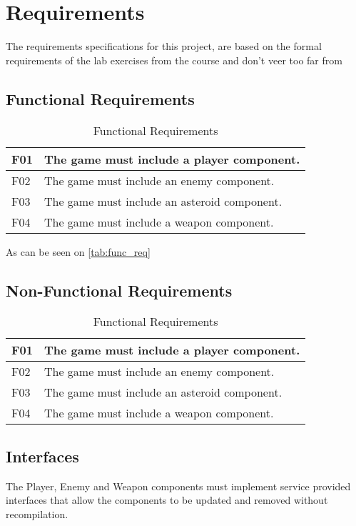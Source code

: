\section{Requirements}
The requirements specifications for this project, are based on the formal requirements of
the lab exercises from the course and don't veer too far from 

\subsection{Functional Requirements}
\begin{table}[H]
    \begin{center}
        \begin{tabulary}{1.0\textwidth}{l | L}
            \toprule
            F01 & The game must include a player component. \\
            \midrule
            F02 & The game must include an enemy component. \\
            \midrule
            F03 & The game must include an asteroid component. \\
            \midrule
            F04 & The game must include a weapon component. \\
            \bottomrule
        \end{tabulary}
    \end{center}
    \caption{Functional Requirements}
    \label{tab:func_req}
\end{table}

As can be seen on \autoref{tab:func_req}

\subsection{Non-Functional Requirements}
\begin{table}[H]
    \begin{center}
        \begin{tabulary}{1.0\textwidth}{l | L}
            \toprule
            F01 & The game must include a player component. \\
            \midrule
            F02 & The game must include an enemy component. \\
            \midrule
            F03 & The game must include an asteroid component. \\
            \midrule
            F04 & The game must include a weapon component. \\
            \bottomrule
        \end{tabulary}
    \end{center}
    \caption{Functional Requirements}
    \label{tab:nfunc_req}
\end{table}
\subsection{Interfaces}


The Player, Enemy and Weapon components must implement service provided 
interfaces that allow the components to be updated and removed without 
recompilation.